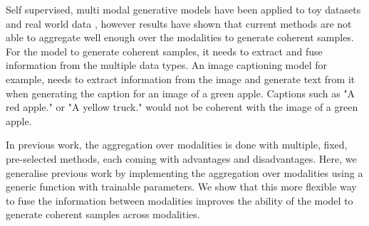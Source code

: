 Self supervised, multi modal generative models have been applied to toy datasets \citep{shi_variational_2019, sutter_generalized_2020, poe} and real world data \citep{klug_multimodal_nodate}, however results have shown that current methods are not able to aggregate well enough over the modalities to generate coherent samples.
For the model to generate coherent samples, it needs to extract and fuse information from the multiple data types.
An image captioning model for example, needs to extract information from the image and generate text from it when generating the caption for an image of a green apple.
Captions such as "A red apple." or "A yellow truck." would not be coherent with the image of a green apple.

In previous work, the aggregation over modalities is done with multiple, fixed, pre-selected methods, each coming with advantages and disadvantages.
Here, we generalise previous work by implementing the aggregation over modalities using a generic function with trainable parameters.
We show that this more flexible way to fuse the information between modalities improves the ability of the model to generate coherent samples across modalities.